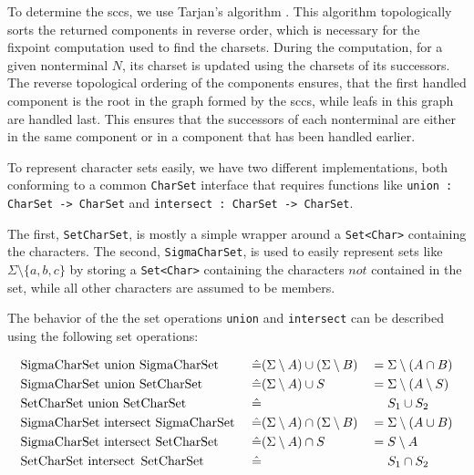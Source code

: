 To determine the \acp{scc}, we use Tarjan's algorithm \cite{tarjan}. This algorithm topologically sorts the returned components in reverse order, which is necessary for the fixpoint computation used to find the charsets.
During the computation, for a given nonterminal $N$, its charset is updated using the charsets of its successors. The reverse topological ordering of the components ensures, that the first handled component is the root in the graph formed by the \acp{scc}, while leafs in this graph are handled last. This ensures that the successors of each nonterminal are either in the same component or in a component that has been handled earlier.

To represent character sets easily, we have two different implementations, both conforming to a common \lstinline|CharSet| interface that requires functions like \lstinline|union : CharSet -> CharSet| and \lstinline|intersect : CharSet -> CharSet|.

The first, \lstinline|SetCharSet|, is mostly a simple wrapper around a \lstinline|Set<Char>| containing the characters.
The second, \lstinline|SigmaCharSet|, is used to easily represent sets like $\Sigma \setminus \{a, b, c\}$ by storing a \lstinline|Set<Char>| containing the characters $not$ contained in the set, while all other characters are assumed to be members.

The behavior of the the set operations \lstinline|union| and \lstinline|intersect| can be described using the following set operations:

\noindent
\begin{alignat*}{3}
	& \text{\lstinline|SigmaCharSet union SigmaCharSet| } && \hat{=} (\Sigma \setminus A) \cup (\Sigma \setminus B) & &= \Sigma \setminus (A \cap B) \\
	& \text{\lstinline|SigmaCharSet union SetCharSet| } && \hat{=} (\Sigma \setminus A) \cup S & &= \Sigma \setminus (A \setminus S) \\
	& \text{\lstinline|SetCharSet union SetCharSet| } && \hat{=} & &\phantom{{}={}} S_1 \cup S_2 \\
	& \text{\lstinline|SigmaCharSet intersect SigmaCharSet| } && \hat{=} (\Sigma \setminus A) \cap (\Sigma \setminus B) & &= \Sigma \setminus (A \cup B) \\
	& \text{\lstinline|SigmaCharSet intersect SetCharSet| } && \hat{=} (\Sigma \setminus A) \cap S & &= S \setminus A \\
	& \text{\lstinline|SetCharSet intersect SetCharSet| } && \hat{=} & &\phantom{{}={}} S_1 \cap S_2
\end{alignat*}

